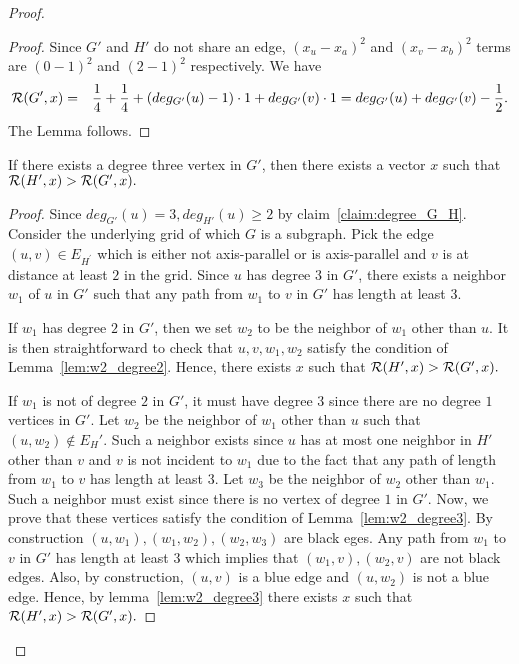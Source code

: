 \begin{proof}
\begin{proof}
Since $G'$ and $H'$ do not share an edge, $(x_u - x_a)^2$ and $(x_v-x_b)^2$ terms are $(0-1)^2$ and $(2-1)^2$ respectively. We have
\begin{eqnarray*}
{\cal R}(G',x) &=& \frac{1}{4} + \frac{1}{4} + (deg_{G'}(u) - 1) \cdot 1 + deg_{G'}(v) \cdot 1 = deg_{G'}(u) + deg_{G'}(v) -\frac{1}{2}.
\end{eqnarray*}
The Lemma follows. 
\end{proof}

\begin{lemma}\label{lem:vertex_degree_3}
If there exists a degree three vertex in $G'$, then there exists a vector $x$ such that ${\cal R}(H',x)> {\cal R}(G',x).$ 
\end{lemma}
\begin{proof}
Since $deg_{G'}(u) = 3, deg_{H'}(u) \geq 2$ by claim~\ref{claim:degree_G_H}. Consider the underlying grid of which $G$ is a subgraph. Pick the edge $(u,v) \in E_{H^{'}}$ which is either not axis-parallel or is axis-parallel and $v$ is at distance at least $2$ in the grid. Since $u$ has degree $3$ in $G'$, there exists a neighbor $w_1$ of $u$ in $G'$ such that any path from $w_1$ to $v$ in $G'$ has length at least $3$. 

If $w_1$ has degree $2$ in $G'$, then we set $w_2$ to be the neighbor of $w_1$ other than $u$. It is then straightforward to check that $u,v,w_1,w_2$ satisfy the condition of Lemma~\ref{lem:w2_degree2}. Hence, there exists $x$ such that ${\cal R}(H',x)> {\cal R}(G',x).$

If $w_1$ is not of degree $2$ in $G'$, it must have degree $3$ since there are no degree $1$ vertices in $G'$. Let $w_2$ be the neighbor of $w_1$ other than $u$ such that $(u,w_2) \not \in E_H'$. Such a neighbor exists since $u$ has at most one neighbor in $H'$ other than $v$ and $v$ is not incident to $w_1$ due to the fact that any path of length from $w_1$ to $v$ has length at least $3$. Let $w_3$ be the neighbor of $w_2$ other than $w_1$. Such a neighbor must exist since there is no vertex of degree $1$ in $G'$. Now, we prove that these vertices satisfy the condition of Lemma~\ref{lem:w2_degree3}. By construction $(u,w_1),(w_1,w_2),(w_2,w_3)$ are black eges. Any path from $w_1$ to $v$ in $G'$ has length at least $3$ which implies that $(w_1,v),(w_2,v)$ are not black edges. Also, by construction, $(u,v)$ is a blue edge and $(u,w_2)$ is not a blue edge. Hence, by lemma~\ref{lem:w2_degree3} there exists $x$ such that ${\cal R}(H',x)> {\cal R}(G',x).$ 
\end{proof}


\end{proof}
